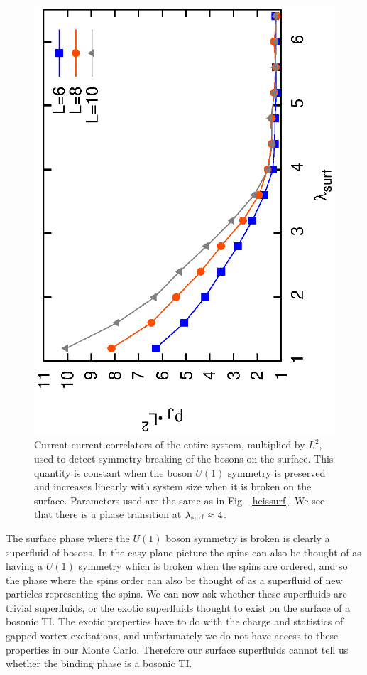 \begin{figure}
\includegraphics[angle=-90,width=\linewidth]{figures/slabcurs.eps}
\caption{Current-current correlators of the entire system, multiplied by $L^2$, used to detect symmetry breaking of the bosons on the surface. This quantity is constant when the boson $U(1)$ symmetry is preserved and increases linearly with system size when it is broken on the surface. Parameters used are the same as in Fig.~\ref{heissurf}. We see that there is a phase transition at $\lambda_{\rm surf}\approx 4$.
}
\label{slabcurs}
\end{figure} 


The surface phase where the $U(1)$ boson symmetry is broken is clearly a superfluid of bosons. In the easy-plane picture the spins can also be thought of as having a $U(1)$ symmetry which is broken when the spins are ordered, and so the phase where the spins order can also be thought of as a superfluid of new particles representing the spins. We can now ask whether these superfluids are trivial superfluids, or the exotic superfluids thought to exist on the surface of a bosonic TI.\cite{SenthilVishwanath} The exotic properties have to do with the charge and statistics of gapped vortex excitations, and unfortunately we do not have access to these properties in our Monte Carlo. Therefore our surface superfluids cannot tell us whether the binding phase is a bosonic TI.

